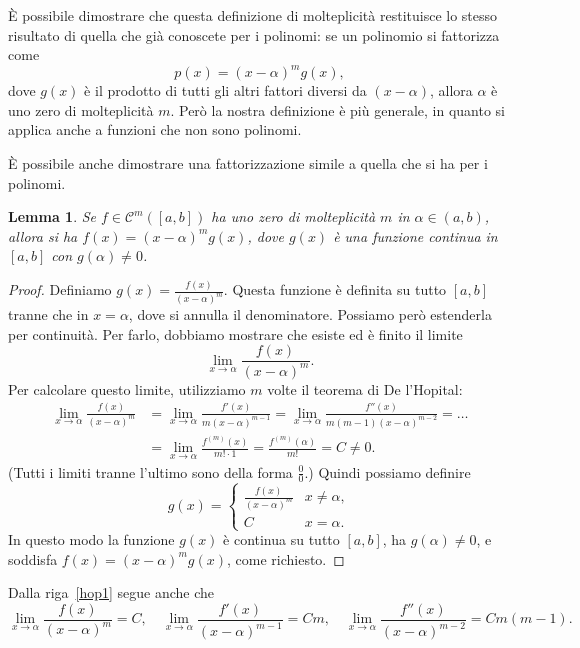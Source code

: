 \documentclass[a4paper]{report}
\newtheorem{lemma}[theorem]{Lemma}
\theoremstyle{definition}
\theoremstyle{remark}
\begin{document}
È possibile dimostrare che questa definizione di molteplicità restituisce lo stesso risultato di quella che già conoscete per i polinomi: se un polinomio si fattorizza come
\[
    p(x) = (x-\alpha)^m g(x),
\]
dove $g(x)$ è il prodotto di tutti gli altri fattori diversi da $(x-\alpha)$, allora $\alpha$ è uno zero di molteplicità $m$. Però la nostra definizione è più generale, in quanto si applica anche a funzioni che non sono polinomi.

È possibile anche dimostrare una fattorizzazione simile a quella che si ha per i polinomi.
\begin{lemma}
Se $f\in\mathcal{C}^m([a,b])$ ha uno zero di molteplicità $m$ in $\alpha \in (a,b)$, allora si ha $f(x) = (x-\alpha)^m g(x)$, dove $g(x)$ è una funzione continua in $[a,b]$ con $g(\alpha) \neq 0$.
\end{lemma}
\begin{proof}
Definiamo $g(x) = \frac{f(x)}{(x-\alpha)^m}$. Questa funzione è definita su tutto $[a,b]$ tranne che in $x=\alpha$, dove si annulla il denominatore. Possiamo però estenderla per continuità. Per farlo, dobbiamo mostrare che esiste ed è finito il limite
\[
\lim_{x\to \alpha} \frac{f(x)}{(x-\alpha)^m}.
\]
Per calcolare questo limite, utilizziamo $m$ volte il teorema di De l'Hopital: 
\begin{align} \label{hop1}
\lim_{x\to \alpha} \frac{f(x)}{(x-\alpha)^m} &= \lim_{x\to \alpha} \frac{f'(x)}{m(x-\alpha)^{m-1}} = \lim_{x\to \alpha} \frac{f''(x)}{m(m-1)(x-\alpha)^{m-2}} = \dots \\
&= \lim_{x\to \alpha} \frac{f^{(m)}(x)}{m!\cdot 1} = \frac{f^{(m)}(\alpha)}{m!} = C\neq 0.
\end{align}
(Tutti i limiti tranne l'ultimo sono della forma $\frac{0}{0}$.)
Quindi possiamo definire
\[
    g(x) = \begin{cases}
        \frac{f(x)}{(x-\alpha)^m} & x\neq \alpha,\\
        C & x=\alpha.
    \end{cases}
\]
In questo modo la funzione $g(x)$ è continua su tutto $[a,b]$, ha $g(\alpha)\neq 0$, e soddisfa $f(x) = (x-\alpha)^m g(x)$, come richiesto.
\end{proof}
Dalla riga~\eqref{hop1} segue anche che
\begin{equation} \label{limnotevoli}
\lim_{x\to\alpha} \frac{f(x)}{(x-\alpha)^{m}} = C, \quad \lim_{x\to\alpha} \frac{f'(x)}{(x-\alpha)^{m-1}} = Cm, \quad \lim_{x\to\alpha} \frac{f''(x)}{(x-\alpha)^{m-2}} = Cm(m-1).    
\end{equation}
\end{document}
